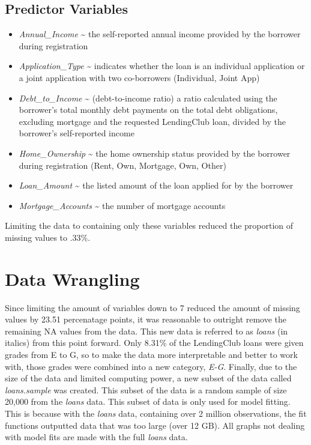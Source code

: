 \documentclass[11pt,]{article}
\begin{document}
\hypertarget{predictor-variables}{%
\subsection{\texorpdfstring{\textbf{Predictor
Variables}}{Predictor Variables}}\label{predictor-variables}}

\begin{itemize}
\item
  \emph{Annual\_Income} \textasciitilde{} the self-reported annual
  income provided by the borrower during registration
\item
  \emph{Application\_Type} \textasciitilde{} indicates whether the loan
  is an individual application or a joint application with two
  co-borrowers (Individual, Joint App)
\item
  \emph{Debt\_to\_Income} \textasciitilde{} (debt-to-income ratio) a
  ratio calculated using the borrower's total monthly debt payments on
  the total debt obligations, excluding mortgage and the requested
  LendingClub loan, divided by the borrower's self-reported income
\item
  \emph{Home\_Ownership} \textasciitilde{} the home ownership status
  provided by the borrower during registration (Rent, Own, Mortgage,
  Own, Other)
\item
  \emph{Loan\_Amount} \textasciitilde{} the listed amount of the loan
  applied for by the borrower
\item
  \emph{Mortgage\_Accounts} \textasciitilde{} the number of mortgage
  accounts
\end{itemize}

Limiting the data to containing only these variables reduced the
proportion of missing values to .33\%.

\hypertarget{data-wrangling}{%
\section{Data Wrangling}\label{data-wrangling}}

Since limiting the amount of variables down to 7 reduced the amount of
missing values by 23.51 percenatage points, it was reasonable to
outright remove the remaining NA values from the data. This new data is
referred to as \emph{loans} (in italics) from this point forward. Only
8.31\% of the LendingClub loans were given grades from E to G, so to
make the data more interpretable and better to work with, those grades
were combined into a new category, \emph{E-G}. Finally, due to the size
of the data and limited computing power, a new subset of the data called
\emph{loans.sample} was created. This subset of the data is a random
sample of size 20,000 from the \emph{loans} data. This subset of data is
only used for model fitting. This is because with the \emph{loans} data,
containing over 2 million observations, the fit functions outputted data
that was too large (over 12 GB). All graphs not dealing with model fits
are made with the full \emph{loans} data.
\end{document}
